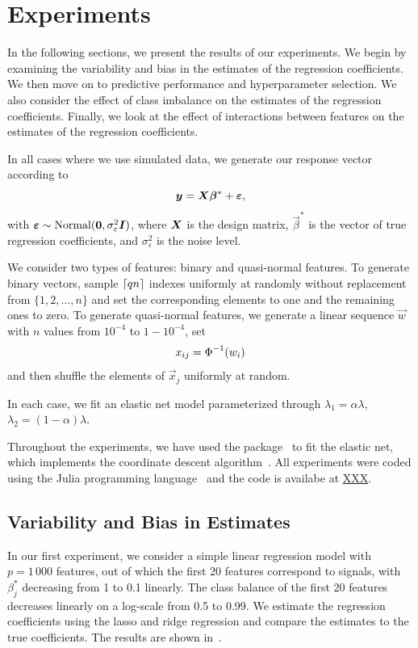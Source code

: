 \section{Experiments}
\label{sec:experiments}

In the following sections, we present the results of our experiments. We begin by examining the variability and bias in the estimates of the regression coefficients. We then move on to predictive performance and hyperparameter selection. We also consider the effect of class imbalance on the estimates of the regression coefficients. Finally, we look at the effect of interactions between features on the estimates of the regression coefficients.

In all cases where we use simulated data, we generate our response vector according to
\[
  \boldsymbol{y} = \boldsymbol{X}\boldsymbol{\beta}^* + \boldsymbol{\varepsilon},
\]
with \(\boldsymbol{\varepsilon} \sim \operatorname{Normal}(\boldsymbol{0}, \sigma_\varepsilon^2 \boldsymbol{I})\), where \(\boldsymbol{X}\) is the design matrix, \(\vec{\beta}^*\) is the vector of true regression coefficients, and \(\sigma_\varepsilon^2\) is the noise level.

We consider two types of features: binary and quasi-normal features.
To generate binary vectors, sample \(\lceil qn \rceil\) indexes uniformly at randomly without replacement from \(\{1,2,\dots,n\}\) and set the corresponding elements to one and the remaining ones to zero.
To generate quasi-normal features, we generate a linear sequence \(\vec{w}\) with \(n\) values from  \(10^{-4}\) to \(1 - 10^{-4}\), set
\[
  x_{ij} = \operatorname{\Phi}^{-1}(w_i)
\]
and then shuffle the elements of \(\vec{x}_j\) uniformly at random.

In each case, we fit an elastic net model parameterized through \(\lambda_1 = \alpha \lambda\), \(\lambda_2 = (1 - \alpha)\lambda\).

Throughout the experiments, we have used the  package~\citep{kornblith2024} to fit the elastic net, which implements the coordinate descent algorithm~\citep{friedman2010}.
All experiments were coded using the Julia programming language~\citep{bezanson2017} and the code is availabe at \url{XXX}.

\subsection{Variability and Bias in Estimates}

In our first experiment, we consider a simple linear regression model with \(p = 1\,000\) features, out of which the first 20 features correspond to signals, with \(\beta_j^*\) decreasing from 1 to 0.1 linearly.
The class balance of the first 20 features decreases linearly on a log-scale from 0.5 to 0.99.
We estimate the regression coefficients using the lasso and ridge regression and compare the estimates to the true coefficients. The results are shown in~.

